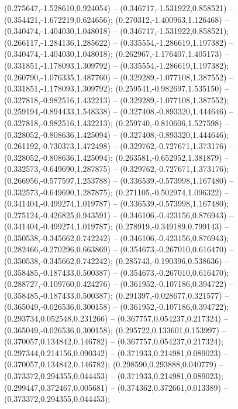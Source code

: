  (0.275647,-1.528610,0.924054) -- (0.346717,-1.531922,0.858521) -- (0.354421,-1.672219,0.624656);
 (0.270312,-1.400963,1.126468) -- (0.340474,-1.404030,1.048018) -- (0.346717,-1.531922,0.858521);
 (0.266117,-1.284136,1.285622) -- (0.335554,-1.286619,1.197382) -- (0.340474,-1.404030,1.048018);
 (0.262967,-1.176407,1.405173) -- (0.331851,-1.178093,1.309792) -- (0.335554,-1.286619,1.197382);
 (0.260790,-1.076335,1.487760) -- (0.329289,-1.077108,1.387552) -- (0.331851,-1.178093,1.309792);
 (0.259541,-0.982697,1.535150) -- (0.327818,-0.982516,1.432213) -- (0.329289,-1.077108,1.387552);
 (0.259194,-0.894433,1.548338) -- (0.327408,-0.893320,1.444646) -- (0.327818,-0.982516,1.432213);
 (0.259740,-0.810606,1.527598) -- (0.328052,-0.808636,1.425094) -- (0.327408,-0.893320,1.444646);
 (0.261192,-0.730373,1.472498) -- (0.329762,-0.727671,1.373176) -- (0.328052,-0.808636,1.425094);
 (0.263581,-0.652952,1.381879) -- (0.332573,-0.649690,1.287875) -- (0.329762,-0.727671,1.373176);
 (0.266956,-0.577597,1.253788) -- (0.336539,-0.573998,1.167480) -- (0.332573,-0.649690,1.287875);
 (0.271105,-0.502974,1.096322) -- (0.341404,-0.499274,1.019787) -- (0.336539,-0.573998,1.167480);
 (0.275124,-0.426825,0.943591) -- (0.346106,-0.423156,0.876943) -- (0.341404,-0.499274,1.019787);
 (0.278919,-0.349189,0.799143) -- (0.350538,-0.345662,0.742242) -- (0.346106,-0.423156,0.876943);
 (0.282466,-0.270296,0.663869) -- (0.354673,-0.267010,0.616470) -- (0.350538,-0.345662,0.742242);
 (0.285743,-0.190396,0.538636) -- (0.358485,-0.187433,0.500387) -- (0.354673,-0.267010,0.616470);
 (0.288727,-0.109760,0.424276) -- (0.361952,-0.107186,0.394722) -- (0.358485,-0.187433,0.500387);
 (0.291397,-0.028677,0.321577) -- (0.365049,-0.026536,0.300158) -- (0.361952,-0.107186,0.394722);
 (0.293734,0.052548,0.231266) -- (0.367757,0.054237,0.217324) -- (0.365049,-0.026536,0.300158);
 (0.295722,0.133601,0.153997) -- (0.370057,0.134842,0.146782) -- (0.367757,0.054237,0.217324);
 (0.297344,0.214156,0.090342) -- (0.371933,0.214981,0.089023) -- (0.370057,0.134842,0.146782);
 (0.298590,0.293888,0.040779) -- (0.373372,0.294355,0.044453) -- (0.371933,0.214981,0.089023);
 (0.299447,0.372467,0.005681) -- (0.374362,0.372661,0.013389) -- (0.373372,0.294355,0.044453);
